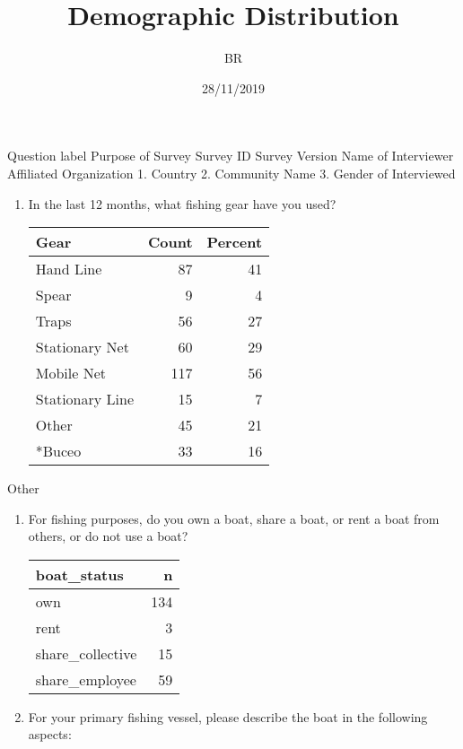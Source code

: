 \documentclass[]{article}
\title{Demographic Distribution}
\author{BR}
\date{28/11/2019}
\providecommand{\tightlist}{%
  \setlength{\itemsep}{0pt}\setlength{\parskip}{0pt}}
\begin{document}
\maketitle

Question label Purpose of Survey Survey ID Survey Version Name of
Interviewer Affiliated Organization 1. Country 2. Community Name 3.
Gender of Interviewed

\begin{enumerate}
\def\labelenumi{\arabic{enumi}.}
\setcounter{enumi}{3}
\tightlist
\item
  In the last 12 months, what fishing gear have you used?

  \begin{table}[H]
  \centering
  \begin{tabular}{l|r|r}
  \hline
  Gear & Count & Percent\\
  \hline
  Hand Line & 87 & 41\\
  \hline
  Spear & 9 & 4\\
  \hline
  Traps & 56 & 27\\
  \hline
  Stationary Net & 60 & 29\\
  \hline
  Mobile Net & 117 & 56\\
  \hline
  Stationary Line & 15 & 7\\
  \hline
  Other & 45 & 21\\
  \hline
  *Buceo & 33 & 16\\
  \hline
  \end{tabular}
  \end{table}
\end{enumerate}

Other

\begin{enumerate}
\def\labelenumi{\arabic{enumi}.}
\setcounter{enumi}{4}
\tightlist
\item
  For fishing purposes, do you own a boat, share a boat, or rent a boat
  from others, or do not use a boat?

  \begin{table}[H]
  \centering
  \begin{tabular}{l|r}
  \hline
  boat\_status & n\\
  \hline
  own & 134\\
  \hline
  rent & 3\\
  \hline
  share\_collective & 15\\
  \hline
  share\_employee & 59\\
  \hline
  \end{tabular}
  \end{table}
\item
  For your primary fishing vessel, please describe the boat in the
  following aspects:
\end{enumerate}
\end{document}
